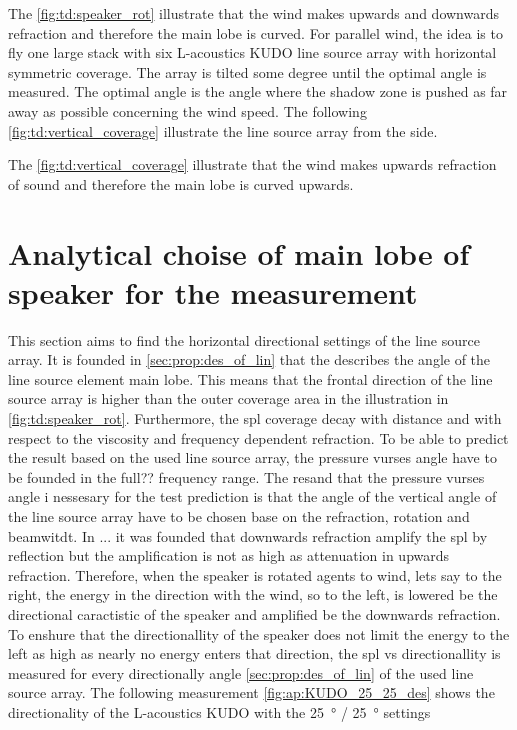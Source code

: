 
The \autoref{fig:td:speaker_rot} illustrate that the wind makes upwards and downwards refraction and therefore the main lobe is curved. For parallel wind, the idea is to fly one large stack with six L-acoustics KUDO line source array with horizontal symmetric coverage. The array is tilted some degree until the optimal angle is measured. The optimal angle is the angle where the shadow zone is pushed as far away as possible concerning the wind speed. The following \autoref{fig:td:vertical_coverage} illustrate the line source array from the side.

   

The \autoref{fig:td:vertical_coverage} illustrate that the wind makes upwards refraction of sound and therefore the main lobe is curved upwards.



\section{Analytical choise of main lobe of speaker for the measurement}

This section aims to find the horizontal directional settings of the line source array. It is founded in \autoref{sec:prop:des_of_lin} that the  describes the angle of the line source element main lobe. This means that the frontal direction of the line source array is  higher than the outer coverage area in the illustration in \autoref{fig:td:speaker_rot}. Furthermore, the \gls{spl} coverage decay with distance and with respect to the viscosity and frequency dependent refraction. To be able to predict the result based on the used line source array, the pressure vurses angle have to be founded in the full?? frequency range. The resand that the pressure vurses angle i nessesary for the test prediction is that the angle of the vertical angle of the line source array have to be chosen base on the refraction, rotation and beamwitdt. In ... it was founded that downwards refraction amplify the \gls{spl} by reflection but the amplification is not as high as attenuation in upwards refraction. Therefore, when the speaker is rotated agents to wind,  lets say to the right, the energy in the direction with the wind, so to the left, is lowered be the directional caractistic of the speaker and amplified be the downwards refraction. To enshure that the directionallity of the speaker does not limit the energy to the left as high as nearly no energy enters that direction, the \gls{spl} vs directionallity is measured for every directionally angle \autoref{sec:prop:des_of_lin} of the used line source array. The following measurement \autoref{fig:ap:KUDO_25_25_des} shows the directionality of the L-acoustics KUDO with the \SI{25}{\degree} / \SI{25}{\degree} settings 

